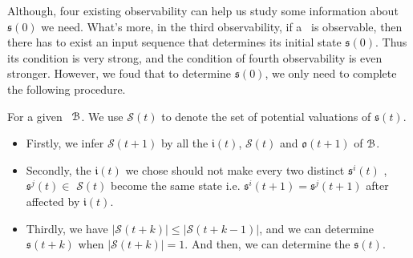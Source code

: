 Although, four existing observability can help us study some information about $\mathfrak{s}(0)$ we need. %
What's more, in the third observability, if a \BCN\ is observable, then there has to exist an input sequence that determines its initial state $\mathfrak{s}(0)$. Thus its condition is very strong, and the condition of fourth observability is even stronger. However, we foud that to determine $\mathfrak{s}(0)$, we only need to complete the following procedure.

For a given \BCN\  ${\mathcal{B}}$.  We use $\mathcal{S}(t)$ to denote the set of potential valuations of $\mathfrak{s}(t)$.
\begin{itemize}
	\item  Firstly, we infer $\mathcal{S}(t+1)$ by all the $\mathfrak{i}(t)$, $\mathcal{S}(t)$ and $\mathfrak{o}(t+1)$ of ${\mathcal{B}}$.
	\item Secondly, the $\mathfrak{i}(t)$ we chose should not make every two distinct $\mathfrak{s}^{i}(t)$ , $\mathfrak{s}^{j}(t)$$\in$ $\mathcal{S}(t)$ become the same state i.e. $\mathfrak{s}^{i}(t+1)=$$\mathfrak{s}^{j}(t+1)$ after affected by $\mathfrak{i}(t)$.  
	\item Thirdly, we have $|$$\mathcal{S}(t+k)$$|\le|$$\mathcal{S}(t+k-1)$$|$, and we can determine $\mathfrak{s}(t+k)$ when $|$$\mathcal{S}(t+k)$$|=1$. And then, we can determine the $\mathfrak{s}(t)$.
\end{itemize}

